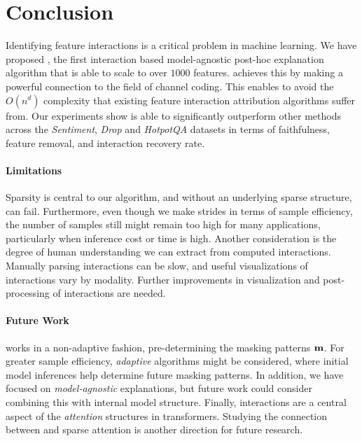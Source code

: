 \section{Conclusion}
\label{sec:conclusion}
Identifying feature interactions is a critical problem in machine learning. 
We have proposed \SpecExp{}, the first interaction based model-agnostic post-hoc explanation algorithm that is able to scale to over $1000$ features. 
%
\SpecExp{} achieves this by making a powerful connection to the field of channel coding. This enables \SpecExp{} to avoid the $O(n^{d})$ complexity that existing feature interaction attribution algorithms suffer from. 
%
Our experiments show \SpecExp{} is able to significantly outperform other methods across the \emph{Sentiment}, \emph{Drop} and \emph{HotpotQA} datasets in terms of faithfulness, feature removal, and interaction recovery rate. 
%

\paragraph{Limitations} Sparsity is central to our algorithm, and without an underlying sparse structure, \SpecExp{} can fail. 
Furthermore, even though we make strides in terms of sample efficiency, the number of samples still might remain too high for many applications, particularly when inference cost or time is high.
%
Another consideration is the degree of human understanding we can extract from computed interactions. 
Manually parsing interactions can be slow, and useful visualizations of interactions vary by modality.
Further improvements in visualization and post-processing of interactions are needed.


\paragraph{Future Work} \SpecExp{} works in a non-adaptive fashion, pre-determining the masking patterns $\mathbf m$. For greater sample efficiency, \emph{adaptive} algorithms might be considered, where initial model inferences help determine future masking patterns. In addition, we have focused on \emph{model-agnostic} explanations, but future work could consider combining this with internal model structure. 
Finally, interactions are a central aspect of the \emph{attention} structures in transformers. Studying the connection between \SpecExp{} and sparse attention  \cite{chen2021scatterbrain} is another direction for future research. 


